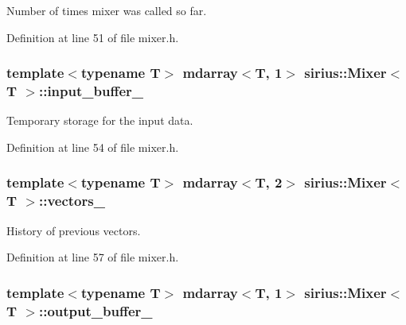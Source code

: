 Number of times mixer was called so far. 



Definition at line 51 of file mixer.\+h.

\hypertarget{classsirius_1_1_mixer_a54eab77660d00c984d0a065a74e5ac0b}{}
\subsubsection[{input\+\_\+buffer\+\_\+}]{\setlength{\rightskip}{0pt plus 5cm}template$<$typename T$>$ mdarray$<$T, 1$>$ {\bf sirius\+::\+Mixer}$<$ T $>$\+::input\+\_\+buffer\+\_\+\hspace{0.3cm}{\ttfamily [protected]}}\label{classsirius_1_1_mixer_a54eab77660d00c984d0a065a74e5ac0b}


Temporary storage for the input data. 



Definition at line 54 of file mixer.\+h.

\hypertarget{classsirius_1_1_mixer_ab3a7332aa714b37c229008b68dab2d5a}{}
\subsubsection[{vectors\+\_\+}]{\setlength{\rightskip}{0pt plus 5cm}template$<$typename T$>$ mdarray$<$T, 2$>$ {\bf sirius\+::\+Mixer}$<$ T $>$\+::vectors\+\_\+\hspace{0.3cm}{\ttfamily [protected]}}\label{classsirius_1_1_mixer_ab3a7332aa714b37c229008b68dab2d5a}


History of previous vectors. 



Definition at line 57 of file mixer.\+h.

\hypertarget{classsirius_1_1_mixer_aaf8fd4ade6cd0b1a5b368be25c6335d3}{}
\subsubsection[{output\+\_\+buffer\+\_\+}]{\setlength{\rightskip}{0pt plus 5cm}template$<$typename T$>$ mdarray$<$T, 1$>$ {\bf sirius\+::\+Mixer}$<$ T $>$\+::output\+\_\+buffer\+\_\+\hspace{0.3cm}{\ttfamily [protected]}}\label{classsirius_1_1_mixer_aaf8fd4ade6cd0b1a5b368be25c6335d3}


